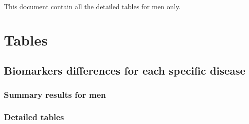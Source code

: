 \documentclass[10pt, a4paper, onecolumn]{article} %
\begin{document}
\listoffigures
\listoftables
\newpage


This document contain all the detailed tables for men only.\\

\section{Tables}

\subsection{Biomarkers differences for each specific disease}

\subsubsection{Summary results for men}




\subsubsection{Detailed tables}












\end{document}
